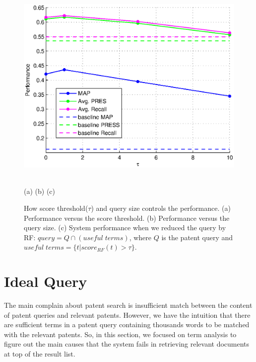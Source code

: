\documentclass{sig-alternate}
\begin{document}
\begin{figure}
\begin{center}
\hfill
\begin{minipage}[b]{0.3\linewidth}
\includegraphics[width=\linewidth]{figs/opt-patentquery-tau.eps}
\end{minipage}
\vspace{-0.5mm}\\
 \hspace{2mm}(a) \hspace{55mm}(b) \hspace{58mm} (c)
\caption{\footnotesize
How score threshold($\tau$) and query size controls the performance.
(a) Performance versus the score threshold. (b) Performance versus the query size. (c) System performance when we reduced the query by RF: $ query = Q\cap (useful \; terms) $, where $ Q $ is the patent query and $ useful\; terms = \{t| score_{RF}(t)>\tau\} $.}
\vspace{-4mm}
\end{center}
\label{fig:control}
\end{figure}
\section{Ideal Query}
The main complain about patent search is insufficient match between the content of patent queries and relevant
patents\cite{lupu2013patent}\cite{magdy2012toward}. However, we have the intuition that there are sufficient terms in a patent query containing thousands words to be matched with the relevant patents. So, in this section, we focused on term analysis to figure out the main causes that the system fails in retrieving relevant documents at top of the result list. 
\end{document}

